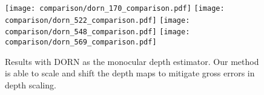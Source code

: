 \begin{figure}[H]
  \texttt{[image: comparison/dorn\_170\_comparison.pdf]}
  \texttt{[image: comparison/dorn\_522\_comparison.pdf]}
  \texttt{[image: comparison/dorn\_548\_comparison.pdf]}
  \texttt{[image: comparison/dorn\_569\_comparison.pdf]}
  \caption{Results with DORN as the monocular depth estimator. Our method is able to scale and shift
    the depth maps to mitigate gross errors in depth scaling.}
  \label{fig:dorn_3}
\end{figure}

